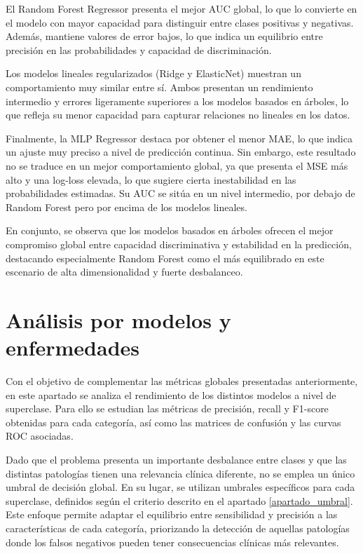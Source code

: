 \documentclass[12pt,a4paper,twoside]{book}
\begin{document}
El Random Forest Regressor presenta el mejor AUC global, lo que lo convierte en el modelo con mayor capacidad para distinguir entre clases positivas y negativas. 
Además, mantiene valores de error bajos, lo que indica un equilibrio entre precisión en las probabilidades y capacidad de discriminación.

Los modelos lineales regularizados (Ridge y ElasticNet) muestran un comportamiento muy similar entre sí. 
Ambos presentan un rendimiento intermedio y errores ligeramente superiores a los modelos basados en árboles, lo que refleja su menor capacidad para capturar relaciones no lineales en los datos.

Finalmente, la MLP Regressor destaca por obtener el menor MAE, lo que indica un ajuste muy preciso a nivel de predicción continua. Sin embargo, este resultado no se traduce en un mejor comportamiento global, ya que presenta el MSE más alto y una log-loss elevada, lo que sugiere cierta inestabilidad en las probabilidades estimadas. 
Su AUC se sitúa en un nivel intermedio, por debajo de Random Forest pero por encima de los modelos lineales.

En conjunto, se observa que los modelos basados en árboles ofrecen el mejor compromiso global entre capacidad discriminativa y estabilidad en la predicción, destacando especialmente Random Forest como el más equilibrado en este escenario de alta dimensionalidad y fuerte desbalanceo.

\section{Análisis por modelos y enfermedades}
\label{sec:analisis-modelos-enfermedades}

Con el objetivo de complementar las métricas globales presentadas anteriormente, en este apartado se analiza el rendimiento de los distintos modelos a nivel de superclase. 
Para ello se estudian las métricas de precisión, recall y F1-score obtenidas para cada categoría, así como las matrices de confusión y las curvas ROC asociadas.

Dado que el problema presenta un importante desbalance entre clases y que las distintas patologías tienen una relevancia clínica diferente, no se emplea un único umbral de decisión global. 
En su lugar, se utilizan umbrales específicos para cada superclase, definidos según el criterio descrito en el apartado \ref{apartado_umbral}. 
Este enfoque permite adaptar el equilibrio entre sensibilidad y precisión a las características de cada categoría, priorizando la detección de aquellas patologías donde los falsos negativos pueden tener consecuencias clínicas más relevantes.
\end{document}

